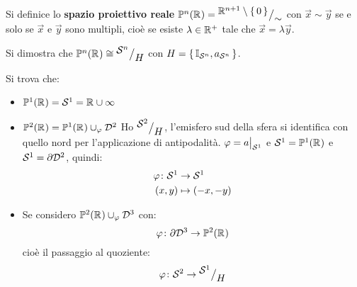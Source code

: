 \begin{definition}
  Si definice lo \textbf{spazio proiettivo reale} $ \mathbb{P}^n(\mathbb{R}^{}) = {^{\textstyle \mathbb{R}^{n+1} \setminus \set{0}}\big/_{\textstyle \sim}} $
  con $ \vec{x} \sim \vec{y} $ se e solo se $ \vec{x} $ e $ \vec{y} $ sono multipli,
  cioè se esiste $ \lambda \in \mathbb{R}^{+} $ tale che $ \vec{x} = \lambda \vec{y} $.
\end{definition}

Si dimostra che $ \mathbb{P}^n(\mathbb{R}^{}) \cong {^{\textstyle \mathcal{S}^{n}}\big/_{\textstyle H}} $ con $ H = \set{\mathbb{I}_{\mathcal{S}^{n}}, a_{\mathcal{S}^{n}}} $.

Si trova che:
\begin{itemize}
\item $ \mathbb{P}^1(\mathbb{R}^{}) = \mathcal{S}^{1} = \mathbb{R}^{} \cup {\infty} $
\item $ \mathbb{P}^2(\mathbb{R}^{}) = \mathbb{P}^1(\mathbb{R}^{}) \cup_\varphi \mathcal{D}^{2} $
  Ho $ {^{\textstyle \mathcal{S}^{2}}\big/_{\textstyle H}} $, l'emisfero sud della sfera si identifica con quello
  nord per l'applicazione di antipodalità.
  $ \varphi = a \big \lvert_{\mathcal{S}^{1}} $ e $ \mathcal{S}^{1} = \mathbb{P}^1(\mathbb{R}^{}) $ e $ \mathcal{S}^{1} = \partial \mathcal{D}^{2} $,
  quindi:
  \begin{align*}
    \varphi \colon \mathcal{S}^{1} & \to \mathcal{S}^{1} \\
    (x,y) & \mapsto (-x,-y)
  \end{align*}
\item Se considero $ \mathbb{P}^2(\mathbb{R}^{}) \cup_\varphi \mathcal{D}^{3} $ con:
  \[
    \varphi \colon \partial \mathcal{D}^{3}  \to \mathbb{P}^2(\mathbb{R}^{})
  \]
  cioè il passaggio al quoziente:
  \[
    \varphi \colon \mathcal{S}^{2}  \to {^{\textstyle \mathcal{S}^{1}}\big/_{\textstyle H}}
  \]
\end{itemize}

